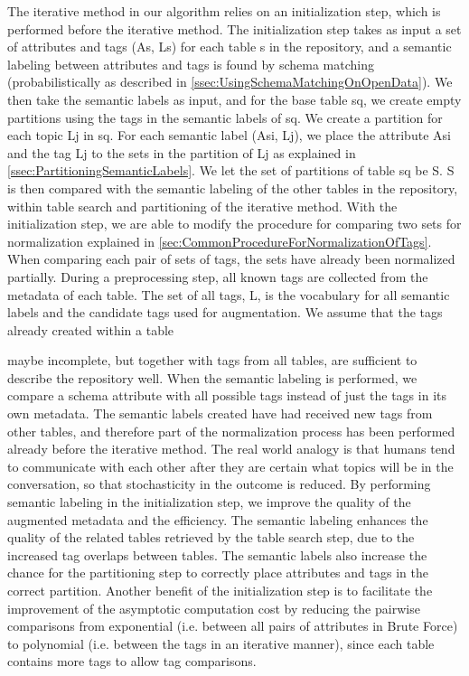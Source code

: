The iterative method in our algorithm relies on an initialization step, which is performed before the iterative method. The initialization step takes as input a set of attributes and tags (As, Ls) for each table s in the repository, and a semantic labeling between attributes and tags is found by schema matching (probabilistically as described in \autoref{ssec:UsingSchemaMatchingOnOpenData}). We then take the semantic labels as input, and for the base table sq, we create empty partitions using the tags in the semantic labels of sq. We create a partition for each topic Lj in sq. For each semantic label (Asi, Lj), we place the attribute Asi and the tag Lj to the sets in the partition of Lj as explained in \autoref{ssec:PartitioningSemanticLabels}. We let the set of partitions of table sq be S. S is then compared with the semantic labeling of the other tables in the repository, within table search and partitioning of the iterative method.
With the initialization step, we are able to modify the procedure for comparing two sets for normalization explained in \autoref{sec:CommonProcedureForNormalizationOfTags}. When comparing each pair of sets of tags, the sets have already been normalized partially. During a preprocessing step, all known tags are collected from the metadata of each table. The set of all tags, L, is the vocabulary for all semantic labels and the candidate tags used for augmentation. We assume that the tags already created within a table

maybe incomplete, but together with tags from all tables, are sufficient to describe the repository well. When the semantic labeling is performed, we compare a schema attribute with all possible tags instead of just the tags in its own metadata. The semantic labels created have had received new tags from other tables, and therefore part of the normalization process has been performed already before the iterative method. The real world analogy is that humans tend to communicate with each other after they are certain what topics will be in the conversation, so that stochasticity in the outcome is reduced.
By performing semantic labeling in the initialization step, we improve the quality of the augmented metadata and the efficiency. The semantic labeling enhances the quality of the related tables retrieved by the table search step, due to the increased tag overlaps between tables. The semantic labels also increase the chance for the partitioning step to correctly place attributes and tags in the correct partition. Another benefit of the initialization step is to facilitate the improvement of the asymptotic computation cost by reducing the pairwise comparisons from exponential (i.e. between all pairs of attributes in Brute Force) to polynomial (i.e. between the tags in an iterative manner), since each table contains more tags to allow tag comparisons.


